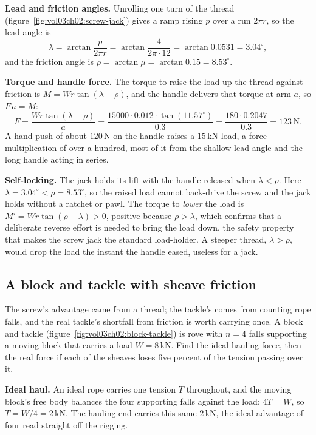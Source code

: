 \textbf{Lead and friction angles.} Unrolling one turn of the thread
(figure~\ref{fig:vol03ch02:screw-jack}) gives a ramp rising $p$ over a run
$2\pi r$, so the lead angle is
\[
\lambda = \arctan\frac{p}{2\pi r}
= \arctan\frac{4}{2\pi\cdot 12}
= \arctan 0.0531 = 3.04^\circ,
\]
and the friction angle is $\rho = \arctan\mu = \arctan 0.15 = 8.53^\circ$.

\textbf{Torque and handle force.} The torque to raise the load up the
thread against friction is $M = W r\tan(\lambda + \rho)$, and the handle
delivers that torque at arm $a$, so $F\,a = M$:
\[
F = \frac{W r\tan(\lambda + \rho)}{a}
= \frac{15000\cdot 0.012\cdot\tan(11.57^\circ)}{0.3}
= \frac{180\cdot 0.2047}{0.3}
= 123\,\text{N}.
\]
A hand push of about $120\,\text{N}$ on the handle raises a
$15\,\text{kN}$ load, a force multiplication of over a hundred, most of it
from the shallow lead angle and the long handle acting in series.

\textbf{Self-locking.} The jack holds its lift with the handle released
when $\lambda < \rho$. Here $\lambda = 3.04^\circ < \rho = 8.53^\circ$, so
the raised load cannot back-drive the screw and the jack holds without a
ratchet or pawl. The torque to \emph{lower} the load is
$M' = W r\tan(\rho - \lambda) > 0$, positive because $\rho > \lambda$, which
confirms that a deliberate reverse effort is needed to bring the load down,
the safety property that makes the screw jack the standard load-holder. A
steeper thread, $\lambda > \rho$, would drop the load the instant the
handle eased, useless for a jack.

\subsection{A block and tackle with sheave friction}

The screw's advantage came from a thread; the tackle's comes from counting
rope falls, and the real tackle's shortfall from friction is worth carrying
once. A block and tackle (figure~\ref{fig:vol03ch02:block-tackle}) is rove
with $n = 4$ falls supporting a moving block that carries a load
$W = 8\,\text{kN}$. Find the ideal hauling force, then the real force if
each of the sheaves loses five percent of the tension passing over it.

\textbf{Ideal haul.} An ideal rope carries one tension $T$ throughout, and
the moving block's free body balances the four supporting falls against the
load: $4T = W$, so $T = W/4 = 2\,\text{kN}$. The hauling end carries this
same $2\,\text{kN}$, the ideal advantage of four read straight off the
rigging.

